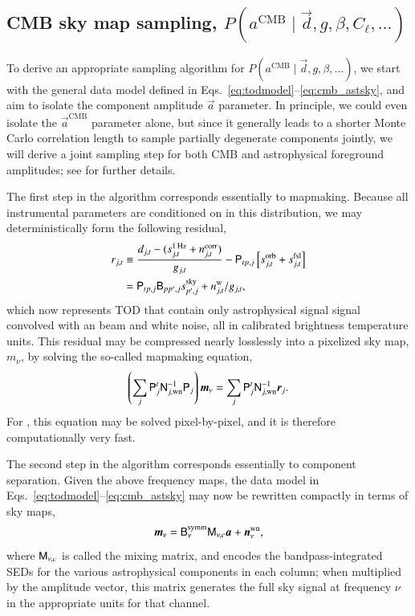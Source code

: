 \documentclass[twocolumn]{aa}
\renewcommand{\d}[0]{\vec{d}}
\newcommand{\n}[0]{\vec{n}}
\renewcommand{\a}[0]{\vec{a}}
\newcommand{\m}[0]{\vec{m}}
\newcommand{\B}[0]{\tens{B}}
\newcommand{\N}[0]{\tens{N}}
\newcommand{\M}[0]{\tens{M}}
\renewcommand{\r}[0]{\vec{r}}
\renewcommand{\P}[0]{\tens{P}}
\begin{document}
\subsection{CMB sky map sampling, $P(a^{\mathrm{CMB}}\mid\d, g, \beta,
  C_{\ell},  \ldots)$}
\label{sec:amp_sampling}

To derive an appropriate sampling algorithm for
$P(a^{\mathrm{CMB}}\mid\d, g, \beta, \ldots)$, we start with the general
data model defined in Eqs.~\eqref{eq:todmodel}--\eqref{eq:cmb_astsky},
and aim to isolate the component amplitude $\a$ parameter. In
principle, we could even isolate the $\a^{\mathrm{CMB}}$ parameter
alone, but since it generally leads to a shorter Monte Carlo
correlation length to sample partially degenerate components jointly,
we will derive a joint sampling step for both CMB and astrophysical
foreground amplitudes; see \citet{bp13} for further details.

The first step in the algorithm corresponds essentially to
mapmaking. Because all instrumental parameters are conditioned on in
this distribution, we may deterministically form the following residual,
\begin{align}
  r_{j,t} &\equiv \frac{d_{j,t} - (s^{\mathrm{1\,Hz}}_{j,t} +
    n^{\mathrm{corr}}_{j,t})}{g_{j,t}} - \P_{tp,j}\left[s^{\mathrm{orb}}_{j,t} + s^{\mathrm{fsl}}_{j,t}\right] \\
  &= \P_{tp,j}\B_{pp',j} s^{\mathrm{sky}}_{p',j}  +  n^{\mathrm{w}}_{j,t}/g_{j,t},
  \label{eq:resmodel}
\end{align}
which now represents TOD that contain only astrophysical signal signal
convolved with an \citep[implicitly assumed azimuthally symmetric, see][for an in depth discussion]{bp01} beam and
white noise, all in calibrated brightness temperature units. This
residual may be compressed nearly losslessly into a pixelized sky map,
$m_{\nu}$, by solving the so-called mapmaking equation,
\begin{equation}
  \left(\sum_{j}\P_j^t\N^{-1}_{j,\mathrm{wn}}\P_j\right)\m_{\nu} =
  \sum_j \P_{j}^t\N_{j,\mathrm{wn}}^{-1}\r_{j}.
  \label{eq:mapmaking}
\end{equation}
For \Planck, this equation may be solved pixel-by-pixel, and it is
therefore computationally very fast.

The second step in the algorithm corresponds essentially to component
separation. Given the above frequency maps, the data model in
Eqs.~\eqref{eq:todmodel}--\eqref{eq:cmb_astsky} may now be rewritten
compactly in terms of sky maps,
\begin{equation}
  \m_{\nu} = \B^{\mathrm{symm}}_{\nu}\M_{\nu,c}\a + \n^{\mathrm{wn}}_{\nu},
  \label{eq:mapmodel}
\end{equation}
where $\M_{\nu,c}$ is called the mixing matrix, and encodes the
bandpass-integrated SEDs for the various astrophysical components in
each column; when multiplied by the amplitude vector, this matrix
generates the full sky signal at frequency $\nu$ in the appropriate
units for that channel.
\end{document}
